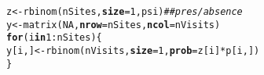 \documentclass[color=usenames,dvipsnames]{beamer}\usepackage[]{graphicx}\usepackage[]{color}
\makeatletter
\newcommand{\hlnum}[1]{\textcolor[rgb]{0.69,0.494,0}{#1}}%
\newcommand{\hlcom}[1]{\textcolor[rgb]{0.514,0.506,0.514}{\textit{#1}}}%
\newcommand{\hlopt}[1]{\textcolor[rgb]{0,0,0}{#1}}%
\newcommand{\hlstd}[1]{\textcolor[rgb]{0,0,0}{#1}}%
\newcommand{\hlkwa}[1]{\textcolor[rgb]{0,0,0}{\textbf{#1}}}%
\newcommand{\hlkwb}[1]{\textcolor[rgb]{0,0.341,0.682}{#1}}%
\newcommand{\hlkwc}[1]{\textcolor[rgb]{0,0,0}{\textbf{#1}}}%
\newcommand{\hlkwd}[1]{\textcolor[rgb]{0.004,0.004,0.506}{#1}}%
\newenvironment{kframe}{%
 \def\at@end@of@kframe{}%
 \ifinner\ifhmode%
  \def\at@end@of@kframe{\end{minipage}}%
  \begin{minipage}{\columnwidth}%
 \fi\fi%
 \def\FrameCommand##1{\hskip\@totalleftmargin \hskip-\fboxsep
 \colorbox{shadecolor}{##1}\hskip-\fboxsep
     \hskip-\linewidth \hskip-\@totalleftmargin \hskip\columnwidth}%
 \MakeFramed {\advance\hsize-\width
   \@totalleftmargin\z@ \linewidth\hsize
   \@setminipage}}%
 {\par\unskip\endMakeFramed%
 \at@end@of@kframe}
\newenvironment{knitrout}{}{} %
\makeatother
\begin{document}
\begin{frame}[fragile]
\begin{enumerate}[<+->]
\begin{knitrout}
\color{fgcolor}\begin{kframe}
\begin{alltt}
\hlstd{z} \hlkwb{<-} \hlkwd{rbinom}\hlstd{(nSites,} \hlkwc{size}\hlstd{=}\hlnum{1}\hlstd{, psi)}            \hlcom{## pres/absence}
\hlstd{y} \hlkwb{<-} \hlkwd{matrix}\hlstd{(}\hlnum{NA}\hlstd{,} \hlkwc{nrow}\hlstd{=nSites,} \hlkwc{ncol}\hlstd{=nVisits)}
\hlkwa{for}\hlstd{(i} \hlkwa{in} \hlnum{1}\hlopt{:}\hlstd{nSites) \{}
    \hlstd{y[i,]} \hlkwb{<-} \hlkwd{rbinom}\hlstd{(nVisits,} \hlkwc{size}\hlstd{=}\hlnum{1}\hlstd{,} \hlkwc{prob}\hlstd{=z[i]}\hlopt{*}\hlstd{p[i,])}
\hlstd{\}}
\end{alltt}
\end{kframe}
\end{knitrout}
\end{enumerate}
\end{frame}
\end{document}
